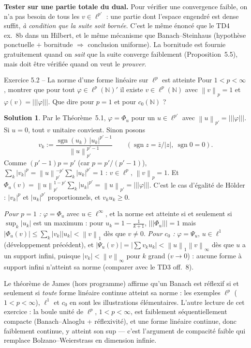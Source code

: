 \documentclass[11pt,a4paper]{article}
\newcommand{\N}{\mathbb{N}}
\newcommand{\norm}[1]{\left\|#1\right\|}
\newcommand{\opnorm}[1]{|\!|\!|#1|\!|\!|}
\DeclareMathOperator{\sgn}{sgn}
\theoremstyle{definition}
\newtheorem*{solution}{Solution}
\begin{document}
\begin{pointcle}
\textbf{Tester sur une partie totale du dual.} Pour vérifier une convergence faible, on n'a pas besoin de tous les $v\in\ell^{p'}$ : une partie dont l'espace engendré est dense suffit, \emph{à condition que la suite soit bornée}. C'est le même énoncé que le TD4 ex.~8b dans un Hilbert, et le même mécanisme que Banach--Steinhaus (hypothèse ponctuelle $+$ bornitude $\Rightarrow$ conclusion uniforme). La bornitude est fournie gratuitement quand on \emph{sait} que la suite converge faiblement (Proposition~5.5), mais doit être vérifiée quand on veut le \emph{prouver}.
\end{pointcle}

\begin{exo}{Exercice 5.2 -- La norme d'une forme linéaire sur $\ell^p$ est atteinte}
Pour $1<p<\infty$, montrer que pour tout $\varphi\in\ell^p(\N)'$ il existe $v\in\ell^p(\N)$ avec $\norm v_p=1$ et $\varphi(v)=\opnorm\varphi$. Que dire pour $p=1$ et pour $c_0(\N)$ ?
\end{exo}

\begin{solution}
Par le Théorème~5.1, $\varphi=\Phi_u$ pour un $u\in\ell^{p'}$ avec $\norm u_{p'}=\opnorm\varphi$. Si $u=0$, tout $v$ unitaire convient. Sinon posons
\[
v_k:=\frac{\sgn(u_k)\,|u_k|^{p'-1}}{\norm u_{p'}^{p'-1}}\qquad(\sgn z=\bar z/|z|,\ \sgn0=0).
\]
Comme $(p'-1)p=p'$ (car $p=p'/(p'-1)$), $\sum_k|v_k|^p=\norm u_{p'}^{-p'}\sum_k|u_k|^{p'}=1$ : $v\in\ell^p$, $\norm v_p=1$. Et $\Phi_u(v)=\norm u_{p'}^{1-p'}\sum_k|u_k|^{p'}=\norm u_{p'}=\opnorm\varphi$. C'est le cas d'égalité de Hölder : $|v_k|^p$ et $|u_k|^{p'}$ proportionnels, et $v_ku_k\ge0$.

\emph{Pour $p=1$ :} $\varphi=\Phi_u$ avec $u\in\ell^\infty$, et la norme est atteinte si et seulement si $\sup_k|u_k|$ est un maximum : pour $u_k=1-\frac1{k+1}$, $\opnorm{\Phi_u}=1$ mais $|\Phi_u(v)|\le\sum_k|v_k||u_k|<\norm v_1$ dès que $v\ne0$. \emph{Pour $c_0$ :} $\varphi=\Psi_u$, $u\in\ell^1$ (développement précédent), et $|\Psi_u(v)|=|\sum v_ku_k|<\norm u_1\norm v_\infty$ dès que $u$ a un support infini, puisque $|v_k|<\norm v_\infty$ pour $k$ grand ($v\to0$) : aucune forme à support infini n'atteint sa norme (comparer avec le TD3 off.~8).
\end{solution}

\begin{commentaire}
Le théorème de James (hors programme) affirme qu'un Banach est réflexif si et seulement si \emph{toute} forme linéaire continue atteint sa norme : les exemples $\ell^p$ ($1<p<\infty$), $\ell^1$ et $c_0$ en sont les illustrations élémentaires. L'autre lecture de cet exercice : la boule unité de $\ell^p$, $1<p<\infty$, est faiblement séquentiellement compacte (Banach--Alaoglu + réflexivité), et une forme linéaire continue, donc faiblement continue, y atteint son sup — c'est l'argument de compacité faible qui remplace Bolzano--Weierstrass en dimension infinie.
\end{commentaire}
\end{document}
